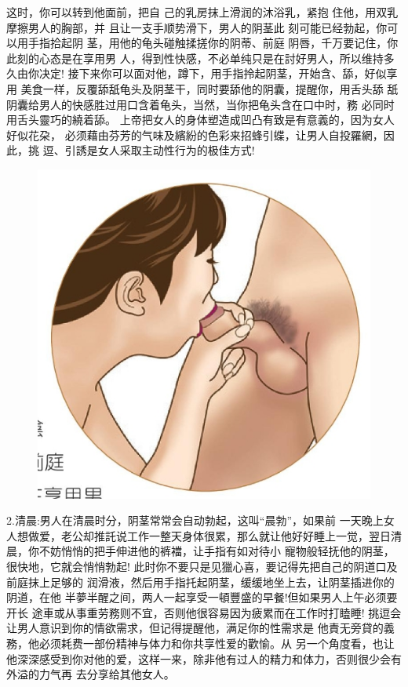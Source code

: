 \documentclass[12pt,UTF8]{ctexbook}
\begin{document}
这时，你可以转到他面前，把自
己的乳房抹上滑润的沐浴乳，紧抱
住他，用双乳摩擦男人的胸部，并
且让一支手顺势滑下，男人的阴茎此
刻可能已经勃起，你可以用手指拾起阴
茎，用他的龟头碰触揉搓你的阴蒂、前庭
阴唇，千万要记住，你此刻的心态是在享用男
人，得到性快感，不必单纯只是在討好男人，所以维持多久由你决定!
接下来你可以面对他，蹲下，用手指拎起阴茎，开始含、舔，好似享用
美食一样，反覆舔舐龟头及阴茎干，同时要舔他的阴囊，提醒你，用舌头舔
舐阴囊给男人的快感胜过用口含着龟头，当然，当你把龟头含在口中时，務
必同时用舌头靈巧的繞着舔。
上帝把女人的身体塑造成凹凸有致是有意義的，因为女人好似花朶，
必须藉由芬芳的气味及繽紛的色彩来招蜂引蝶，让男人自投羅網，因此，挑
逗、引誘是女人采取主动性行为的极佳方式!

\begin{figure}[htbp]
	\centering
	\includegraphics[width=0.7\linewidth]{15}
	\caption{}
	\label{fig:1}
\end{figure}

2.清晨:男人在清晨时分，阴茎常常会自动勃起，这叫“晨勃”，如果前
一天晚上女人想做爱，老公却推託说工作一整天身体很累，那么就让他好好睡上一觉，翌日清晨，你不妨悄悄的把手伸进他的裤襠，让手指有如对待小
寵物般轻抚他的阴茎，很快地，它就会悄悄勃起!
此时你不要只是见獵心喜，要记得先把自己的阴道口及前庭抹上足够的
润滑液，然后用手指托起阴茎，缓缓地坐上去，让阴茎插进你的阴道，在他
半夢半醒之间，两人一起享受一頓豐盛的早餐!但如果男人上午必须要开长
途車或从事重劳務则不宜，否则他很容易因为疲累而在工作时打瞌睡!
挑逗会让男人意识到你的情欲需求，但记得提醒他，满足你的性需求是
他責无旁貸的義務，他必须耗费一部份精神与体力和你共享性爱的歡愉。从
另一个角度看，也让他深深感受到你对他的爱，这样一来，除非他有过人的精力和体力，否则很少会有外溢的力气再
去分享给其他女人。
\end{document}
